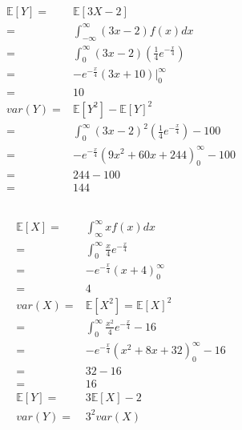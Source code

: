 \documentclass{article}
\begin{document}
    \section{}
        \subsection{}
            \begin{equation*}
                \begin{split}
                    \mathbb{E}[Y]=&\mathbb{E}[3X-2]\\
                        =&\int_{-\infty}^\infty (3x-2)f(x)dx\\
                        =&\int_0^\infty (3x-2)(\frac{1}{4}e^{-\frac{x}{4}})\\
                        =&-e^{-\frac{x}{4}}(3x+10)|_0^\infty\\
                        =&10\\
                    var(Y)=&\mathbb{E}[Y^2]-\mathbb{E}[Y]^2\\
                        =&\int_0^\infty (3x-2)^2(\frac{1}{4}e^{-\frac{x}{4}})-100\\
                        =&-e^{-\frac{x}{4}}(9x^2+60x+244)_0^\infty-100\\
                        =&244-100\\
                        =&144
                \end{split}
            \end{equation*}
        \subsection{}
            \begin{equation*}
                \begin{split}
                    \mathbb{E}[X]=&\int_{\infty}^\infty xf(x)dx\\
                        =&\int_0^\infty \frac{x}{4}e^{-\frac{x}{4}}\\
                        =&-e^{-\frac{x}{4}}(x+4)_0^\infty\\
                        =&4\\
                    var(X)=&\mathbb{E}[X^2]=\mathbb{E}[X]^2\\
                        =&\int_0^\infty \frac{x^2}{4}e^{-\frac{x}{4}}-16\\
                        =&-e^{-\frac{x}{4}}(x^2+8x+32)_0^{\infty}-16\\
                        =&32-16\\
                        =&16\\
                    \mathbb{E}[Y]=&3\mathbb{E}[X]-2\\
                    var(Y)=&3^2var(X)\\
                \end{split}
            \end{equation*}
\end{document}
